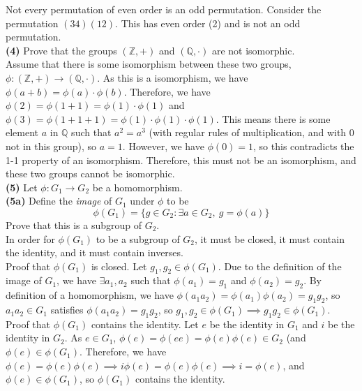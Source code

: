 \documentclass[12pt,letterpaper]{article}
\begin{document}
Not every permutation of even order is an odd permutation. Consider the permutation \((34)(12)\). This has even order (2) and is not an odd permutation. \\

\textbf{(4)} Prove that the groups \((\mathbb{Z}, +)\) and \((\mathbb{Q}, \cdot)\) are not isomorphic. \\

Assume that there is some isomorphism between these two groups, \(\phi : (\mathbb{Z},+) \to (\mathbb{Q},\cdot)\).  As this is a isomorphism, we have \(\phi(a+b) = \phi(a) \cdot \phi(b)\). Therefore, we have \(\phi(2) = \phi(1+1) = \phi(1)\cdot\phi(1)\) and \(\phi(3) = \phi(1+1+1) = \phi(1)\cdot\phi(1)\cdot\phi(1)\). This means there is some element \(a\) in \(\mathbb{Q}\) such that \(a^{2} = a^{3}\) (with regular rules of multiplication, and with 0 not in this group), so \(a=1\). However, we have \(\phi(0) = 1\), so this contradicts the 1-1 property of an isomorphism. Therefore, this must not be an isomorphism, and these two groups cannot be isomorphic. \\

\textbf{(5)} Let \(\phi : G_{1} \to G_{2}\) be a homomorphism. \\

\textbf{(5a)} Define the \textit{image} of \(G_{1}\) under \(\phi\) to be \[\phi(G_{1}) = \{g \in G_{2} : \exists a \in G_{2},\ g = \phi(a)\}\] Prove that this is a subgroup of \(G_{2}\). \\

In order for \(\phi(G_{1})\) to be a subgroup of \(G_{2}\), it must be closed, it must contain the identity, and it must contain inverses. \\

Proof that \(\phi(G_{1})\) is closed. Let \(g_{1}, g_{2} \in \phi(G_{1})\). Due to the definition of the image of \(G_{1}\), we have \(\exists a_{1},a_{2}\) such that \(\phi(a_{1}) = g_{1}\) and \(\phi(a_{2}) = g_{2}\). By definition of a homomorphism, we have \(\phi(a_{1}a_{2}) = \phi(a_{1})\phi(a_{2}) = g_{1}g_{2}\), so \(a_{1}a_{2} \in G_{1}\) satisfies \(\phi(a_{1}a_{2}) = g_{1}g_{2}\), so \(g_{1},g_{2} \in \phi(G_{1})  \implies g_{1}g_{2} \in \phi(G_{1})\). \\

Proof that \(\phi(G_{1})\) contains the identity. Let \(e\) be the identity in \(G_{1}\) and \(i\) be the identity in \(G_{2}\). As \(e \in G_{1}\), \(\phi(e) = \phi(ee) = \phi(e)\phi(e) \in G_{2}\) (and \(\phi(e) \in \phi(G_{1})\). Therefore, we have \(\phi(e) = \phi(e)\phi(e) \implies i\phi(e) = \phi(e)\phi(e) \implies i = \phi(e)\), and \(\phi(e) \in \phi(G_{1})\), so \(\phi(G_{1})\) contains the identity. \\
\end{document}
